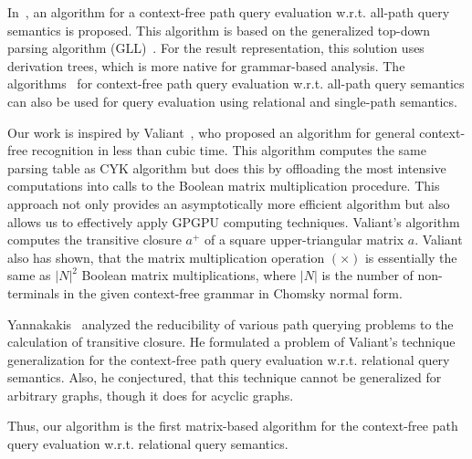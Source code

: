 In~\cite{GLL}, an algorithm for a context-free path query evaluation w.r.t. all-path query semantics is proposed. This algorithm is based on the generalized top-down parsing algorithm (GLL)~\cite{scott2010gll}. For the result representation, this solution uses derivation trees, which is more native for grammar-based analysis. The algorithms~\cite{GLL, hellingsPathQuerying} for context-free path query evaluation w.r.t. all-path query semantics can also be used for query evaluation using relational and single-path semantics.

Our work is inspired by Valiant~\cite{valiant}, who proposed an algorithm for general context-free recognition in less than cubic time. This algorithm computes the same parsing table as CYK algorithm but does this by offloading the most intensive computations into calls to the Boolean matrix multiplication procedure. This approach not only provides an asymptotically more efficient algorithm but also allows us to effectively apply GPGPU computing techniques. Valiant's algorithm computes the transitive closure $a^+$ of a square upper-triangular matrix $a$. Valiant also has shown, that the matrix multiplication operation $(\times)$ is essentially the same as $|N|^2$ Boolean matrix multiplications, where $|N|$ is the number of non-terminals in the given context-free grammar in Chomsky normal form.

Yannakakis~\cite{transitive-closure} analyzed the reducibility of various path querying problems to the calculation of transitive closure. He formulated a problem of Valiant's technique generalization for the context-free path query evaluation w.r.t. relational query semantics. Also, he conjectured, that this technique cannot be generalized for arbitrary graphs, though it does for acyclic graphs.

Thus, our algorithm is the first matrix-based algorithm for the context-free path query evaluation w.r.t. relational query semantics.